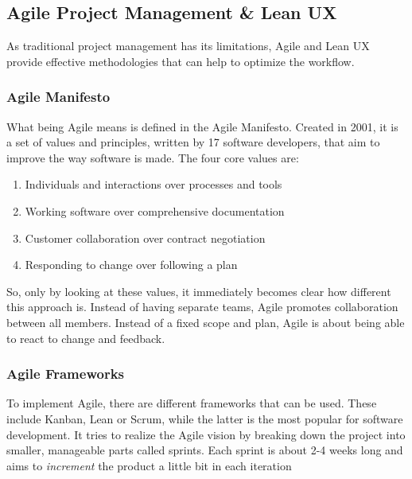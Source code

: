 \newpage
\subsection{Agile Project Management \& Lean UX} \label{Agile Project Management & Lean UX}
As traditional project management has its limitations, Agile and Lean UX provide effective
methodologies that can help to optimize the workflow.

\subsubsection{Agile Manifesto}

What being Agile means is defined in the Agile Manifesto. Created in 2001, it is a set of values and
principles, written by 17 software developers, that aim to improve the way software is made. The
four core values are:
\begin{enumerate}
    \item Individuals and interactions over processes and tools
    \item Working software over comprehensive documentation
    \item Customer collaboration over contract negotiation
    \item Responding to change over following a plan
\end{enumerate}

So, only by looking at these values, it immediately becomes clear how different this approach is.
Instead of having separate teams, Agile promotes collaboration between all members. Instead of a
fixed scope and plan, Agile is about being able to react to change and feedback.

\subsubsection{Agile Frameworks}
To implement Agile, there are different frameworks that can be used. These include Kanban, Lean or
Scrum, while the latter is the most popular for software development. It tries to realize the Agile
vision by breaking down the project into smaller, manageable parts called sprints. Each sprint is
about 2-4 weeks long and aims to \textit{increment} the product a little bit in each iteration

